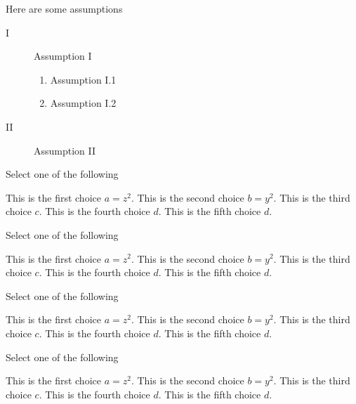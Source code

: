 \begin{gram}
Here are some assumptions
\begin{description}
\item[I] Assumption I
\begin{enumerate}
\item Assumption I.1
\item Assumption I.2
\end{enumerate}

\item[II] Assumption II
\end{description}
\end{gram}


\begin{problem}[Pickone I]
Select one of the following
\begin{pickone}
\choice This is the first choice $a = z^2$.
\choice This is the second choice $b = y^2$.
\correctchoice This is the third choice $c$.
\correctchoice This is the fourth choice $d$.
\choice This is the fifth choice $d$.
\end{pickone}
\end{problem}

\begin{problem}[Pickone I.2]
Select one of the following
\begin{pickany}
\choice This is the first choice $a = z^2$.
\choice This is the second choice $b = y^2$.
\correctchoice This is the third choice $c$.
\correctchoice This is the fourth choice $d$.
\choice This is the fifth choice $d$.
\end{pickany}
\end{problem}


\begin{problem}[Pickone II]
Select one of the following
\begin{pickone}[20]
\choice This is the first choice $a = z^2$.
\choice This is the second choice $b = y^2$.
\correctchoice This is the third choice $c$.
\correctchoice This is the fourth choice $d$.
\choice This is the fifth choice $d$.
\end{pickone}
\end{problem}

\begin{problem}
Select one of the following
\begin{pickone}[30]
\choice This is the first choice $a = z^2$.
\choice This is the second choice $b = y^2$.
\correctchoice This is the third choice $c$.
\correctchoice This is the fourth choice $d$.
\choice This is the fifth choice $d$.
\end{pickone}
\end{problem}


